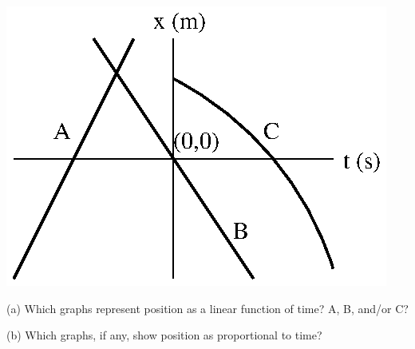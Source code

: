 \vspace{0.3cm}
{\par\centering \includegraphics{measuring/measuring_fig3.eps} \par}
\vspace{0.3cm}

(a) Which graphs represent position as a linear function of time? A, B, and/or
C?
\vspace{10mm}

(b) Which graphs, if any, show position as proportional to time?

